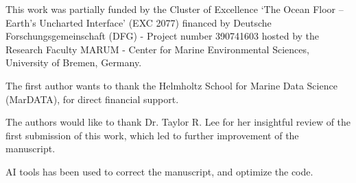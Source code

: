 \documentclass[journal abbreviation, manuscript]{copernicus}
\begin{document}


\begin{acknowledgements}
This work was partially funded by the Cluster of Excellence `The Ocean Floor – Earth’s Uncharted Interface' (EXC 2077) financed by Deutsche Forschungsgemeinschaft (DFG) - Project number 390741603 hosted by the Research Faculty MARUM - Center for Marine Environmental Sciences, University of Bremen, Germany.

The first author wants to thank the Helmholtz School for Marine Data Science (MarDATA), for direct financial support.

The authors would like to thank Dr. Taylor R. Lee for her insightful review of the first submission of this work, which led to further improvement of the manuscript.

AI tools has been used to correct the manuscript, and optimize the code.
\end{acknowledgements}





\newpage


\end{document}

